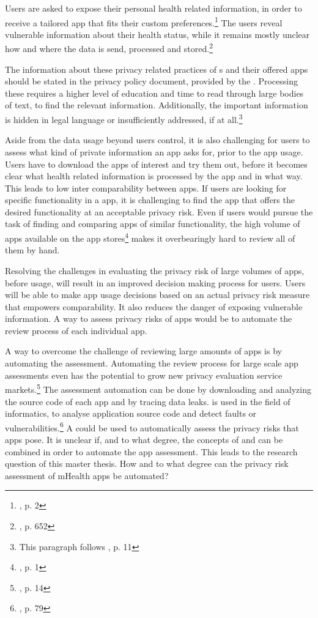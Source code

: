 \documentclass[
	a4paper,
	oneside,
	12pt,
	liststotocnumbered
]{article}
\let\cite\textcite
\begin{document}
Users are asked to expose their personal health related information, in order to receive a tailored app that fits their custom preferences.\footnote{\cite{Chen2012}, p. 2}
The users reveal vulnerable information about their health status, while it remains mostly unclear how and where the data is send, processed and stored.\footnote{\cite{He2014a}, p. 652}

The information about these privacy related practices of \ap s and their offered apps should be stated in the privacy policy document, provided by the \ap.
Processing these \pps requires a higher level of education and time to read through large bodies of text, to find the relevant information. 
Additionally, the important information is hidden in legal language or insufficiently addressed, if at all.\footnote{This paragraph follows \cite{Dehling2014}, p. 11}

Aside from the data usage beyond users control, it is also challenging for users to assess what kind of private information an app asks for, prior to the app usage. 
Users have to download the apps of interest and try them out, before it becomes clear what health related information is processed by the app and in what way. 
This leads to low inter comparability between apps. 
If users are looking for specific functionality in a \mH app, it is challenging to find the app that offers the desired functionality at an acceptable privacy risk. 
Even if users would pursue the task of finding and comparing \mH apps of similar functionality, the high volume of apps available on the app stores\footnote{\cite{Enck2011}, p. 1} makes it overbearingly hard to review all of them by hand.

Resolving the challenges in evaluating the privacy risk of large volumes of \mH apps, before usage, will result in an improved decision making process for users. 
Users will be able to make app usage decisions based on an actual privacy risk measure that empowers comparability.
It also reduces the danger of exposing vulnerable information. 
A way to assess privacy risks of \mH apps would be to automate the review process of each individual app. 

A way to overcome the challenge of reviewing large amounts of \mH apps is by automating the assessment.
Automating the review process for large scale app assessments even has the potential to grow new privacy evaluation service markets.\footnote{\cite{Enck2011}, p. 14}
The assessment automation can be done by downloading and analyzing the source code of each app and by tracing data leaks. 
\Sca is used in the field of informatics, to analyse application source code and detect faults or vulnerabilities.\footnote{\cite{Baca2008}, p. 79} 
A \sca could be used to automatically assess the privacy risks that \mH apps pose.
It is unclear if, and to what degree, the concepts of \sca and \pra can be combined in order to automate the app assessment.
This leads to the research question of this master thesis. How and to what degree can the privacy risk assessment of mHealth apps be automated?
\end{document}
